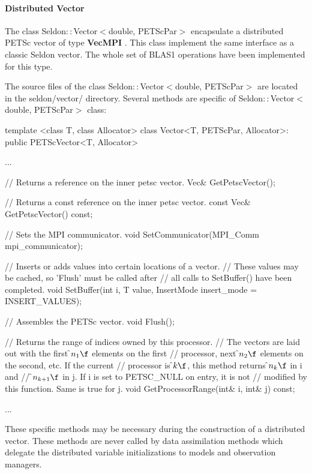 \hypertarget{seq-par-ds-vector}{}\paragraph{Distributed Vector}\label{seq-par-ds-vector}


The class Seldon$::$Vector$<$double, PETScPar$>$  encapsulate a distributed PETSc vector of type \textbf{VecMPI} . This class implement the same interface as a classic Seldon vector. The whole set of BLAS1 operations have been implemented for this type.

The source files of the class Seldon$::$Vector$<$double, PETScPar$>$  are located in the seldon/vector/ directory. Several methods are specific of  Seldon$::$Vector$<$double, PETScPar$>$ class:

\begin{frame_cpp}
template <class T, class Allocator>
class Vector<T, PETScPar, Allocator>: public PETScVector<T, Allocator>
{
	...

    // Returns a reference on the inner petsc vector.
    Vec& GetPetscVector();

    // Returns a const reference on the inner petsc vector.
    const Vec& GetPetscVector() const;

    // Sets the MPI communicator.
    void SetCommunicator(MPI_Comm mpi_communicator);

    // Inserts or adds values into certain locations of a vector.
    // \warning These values may be cached, so 'Flush' must be called after
    // all calls to SetBuffer() have been completed.
    void SetBuffer(int i, T value, InsertMode insert_mode = INSERT_VALUES);

    // Assembles the PETSc vector.
    void Flush();

    // Returns the range of indices owned by this processor.
    // The vectors are laid out with the first \f$n_1\f$ elements on the first
    // processor, next \f$n_2\f$ elements on the second, etc. If the current
    // processor is \f$k\f$, this method returns \f$n_k\f$ in \a i and
    // \f$n_{k+1}\f$ in \a j. If \a i is set to PETSC_NULL on entry, it is not
    // modified by this function. Same is true for \a j.
    void GetProcessorRange(int& i, int& j) const;

    ...
}
\end{frame_cpp}


\par These specific methods may be necessary during the construction of a distributed vector. These methods are never called by data assimilation methods which delegate the distributed variable initializations to models and observation managers.


